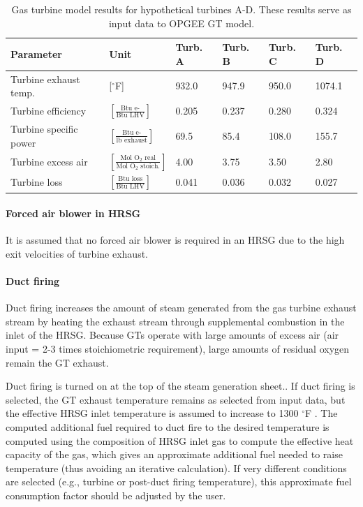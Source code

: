 \documentclass[11pt]{report}
\newcommand{\marg}[1]{{\footnotesize\textit{\textcolor{stanford}{'#1'}}}}
\newcommand{\marginnote}[1]{\marginpar{\marg{#1}}}
\begin{document}
\begin{table}
\caption{Gas turbine model results for hypothetical turbines A-D. These results serve as input data to OPGEE GT model.}
\label{tab:GT_inputs}
\begin{scriptsize}
\begin{tabularx}{1\columnwidth}{p{}p{}p{}p{}p{}p{}}
\toprule
Parameter & Unit & Turb. A & Turb. B & Turb. C & Turb. D \\
\midrule
Turbine exhaust temp. &[$^\circ$F] & 932.0 & 947.9 & 950.0 & 1074.1\\
Turbine efficiency &$\left[\frac{\textrm{Btu e-}}{\textrm{Btu LHV}}\right]$ & 0.205 & 0.237 & 0.280 & 0.324\\ 
Turbine specific power & $\left[\frac{\textrm{Btu e-}}{\textrm{lb exhaust}}\right]$& 69.5 & 85.4 & 108.0 & 155.7\\ 
Turbine excess air & $\left[\frac{\textrm{Mol O$_2$ real}}{\textrm{Mol O$_2$ stoich.}}\right]$& 4.00 & 3.75 & 3.50 & 2.80\\
Turbine loss & $\left[\frac{\textrm{Btu loss}}{\textrm{Btu LHV}}\right]$& 0.041 & 0.036 & 0.032 & 0.027\\ 
\bottomrule
\end{tabularx}
\end{scriptsize}
\end{table}

\paragraph{Forced air blower in HRSG}

It is assumed that no forced air blower is required in an HRSG due to the high exit velocities of turbine exhaust.

\paragraph{Duct firing}

Duct firing increases the amount of steam generated from the gas turbine exhaust stream by heating the exhaust stream through supplemental combustion in the inlet of the HRSG. Because GTs operate with large amounts of excess air (air input = 2-3 times stoichiometric requirement), large amounts of residual oxygen remain the GT exhaust.

Duct firing is turned on at the top of the steam generation sheet.\marginnote{Steam Generation 1.2.7.2.3}.  If duct firing is selected, the GT exhaust temperature remains as selected from input data, but the effective HRSG inlet temperature is assumed to increase to 1300 $^\circ$F \cite[Table 5, Case 2]{Ganapathy1996}.  The computed additional fuel required to duct fire to the desired temperature is computed using the composition of HRSG inlet gas to compute the effective heat capacity of the gas, which gives an approximate additional fuel needed to raise temperature (thus avoiding an iterative calculation). \marginnote{Steam Generation 2.3.8.4} If very different conditions are selected (e.g., turbine or post-duct firing temperature), this approximate fuel consumption factor should be adjusted by the user.
\end{document}
